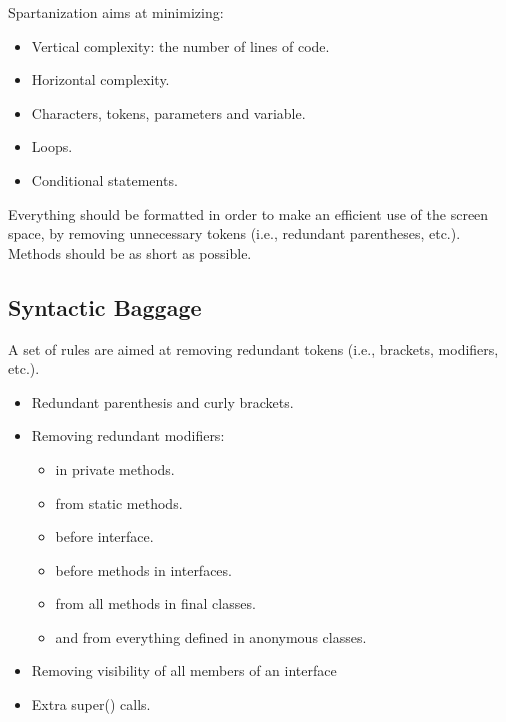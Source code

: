 Spartanization aims at minimizing:
\begin{itemize}
 \item Vertical complexity: the number of lines of code.
 \item Horizontal complexity.
 \item Characters, tokens, parameters and variable.
 \item Loops.
 \item Conditional statements.
\end{itemize}



Everything should be formatted in order to make an efficient use of the screen space,
by removing unnecessary tokens (i.e., redundant parentheses, etc.).
Methods should be as short as possible.

\subsection{Syntactic Baggage}
A set of rules are aimed at removing redundant tokens (i.e., brackets,
modifiers, etc.).
\begin{itemize}
  \item Redundant parenthesis and curly brackets.
  \item Removing redundant modifiers:
  \begin{itemize}
    \item {} in private methods.
    \item {} from static methods.
    \item {} before interface.
    \item {} before methods in interfaces.
    \item {} from all methods in final classes.
    \item {} and  from everything defined in anonymous classes.
  \end{itemize}
  \item Removing visibility of all members of an interface
  \item Extra super() calls.
\end{itemize}

